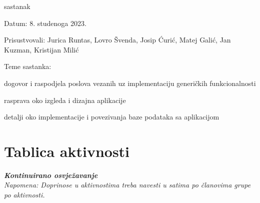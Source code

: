 \begin{packed_enum}
			\item sastanak
			\item[] \begin{packed_item}
			\item Datum: 8. studenoga 2023.
			\item Prisustvovali: Jurica Runtas, Lovro Švenda, Josip Ćurić,
			Matej Galić, Jan Kuzman, Kristijan Milić
			\item Teme sastanka:
			\begin{packed_item}
				\item dogovor i raspodjela poslova vezanih uz implementaciju generičkih funkcionalnosti
				\item rasprava oko izgleda i dizajna aplikacije
				\item detalji oko implementacije i povezivanja baze podataka sa aplikacijom
			\end{packed_item}
			\end{packed_item}
			
		\end{packed_enum}
		
		\eject
		\section*{Tablica aktivnosti}
		
			\textbf{\textit{Kontinuirano osvježavanje}}\\
			
			 \textit{Napomena: Doprinose u aktivnostima treba navesti u satima po članovima grupe po aktivnosti.}

